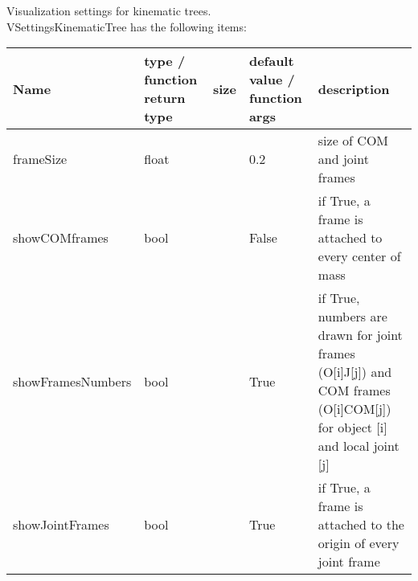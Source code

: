  \label{sec:VSettingsKinematicTree}
Visualization settings for kinematic trees.\\ 
%
VSettingsKinematicTree has the following items:
\begin{center}
  \footnotesize
  \begin{longtable}{| p{4.2cm} | p{2.5cm} | p{0.3cm} | p{3.0cm} | p{6cm} |}
    \hline
    \bf Name & \bf type / function return type & \bf size & \bf default value / function args & \bf description \\ \hline
    frameSize &     float &      &     0.2 &     size of COM and joint frames\\ \hline
    showCOMframes &     bool &      &     False &     if True, a frame is attached to every center of mass\\ \hline
    showFramesNumbers &     bool &      &     True &     if True, numbers are drawn for joint frames (O[i]J[j]) and COM frames (O[i]COM[j]) for object [i] and local joint [j]\\ \hline
    showJointFrames &     bool &      &     True &     if True, a frame is attached to the origin of every joint frame\\ \hline
	  \end{longtable}
	\end{center}


